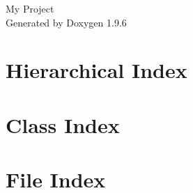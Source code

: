 \documentclass[twoside]{book}
\newcommand{\+}{\discretionary{\mbox{\scriptsize$\hookleftarrow$}}{}{}}
\newcommand{\clearemptydoublepage}{%
    \newpage{\pagestyle{empty}\cleardoublepage}%
  }
\begin{document}
  \raggedbottom
    \hypersetup{pageanchor=false,
                bookmarksnumbered=true,
                pdfencoding=unicode
               }
  \begin{titlepage}
  \vspace*{7cm}
  \begin{center}%
  {\Large My Project}\\
  \vspace*{1cm}
  {\large Generated by Doxygen 1.9.6}\\
  \end{center}
  \end{titlepage}
  \clearemptydoublepage
  \tableofcontents
  \clearemptydoublepage
  \hypersetup{pageanchor=true}
\chapter{Hierarchical Index}

\chapter{Class Index}

\chapter{File Index}

\end{document}
